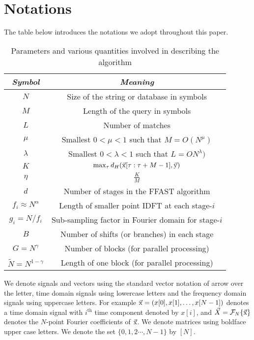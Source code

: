 \section{Notations}

The table below introduces the notations we adopt throughout this paper.
\begin{table}[h!]
\begin{center}
	\begin{tabular}{|c|c|} 	
		\hline		
		\textit{Symbol}	    &  \textit{Meaning} \\		
		\hline
		$N$           				& Size of the string or database in symbols \\
		\hline
		$M$   				        & Length of the query in symbols \\
\hline
        $L$    						&   Number of matches \\
\hline
		$\mu$ 				        & Smallest $0<\mu<1$ such that $M =O(N^{\mu})$\\		
\hline
		$\lambda$       		& Smallest $0<\lambda<1$ such that $L =ON^\lambda)$\\
        \hline
        $K$                        &$\max_{\tau}d_{H}(\vec{\mathrm{x}}[\tau:\tau+M-1],\vec{\mathrm{y}})$\\
        \hline
	    $\eta$             &$\frac{K}{M}$\\
	    \hline
$d$           				& Number of stages in the FFAST algorithm \\
		\hline
$f_i \approx N^\alpha$     & Length of smaller point IDFT at each stage-$i$\\
		\hline
$g_i = N/f_i$     	    &  Sub-sampling factor in Fourier domain for stage-$i$\\
		\hline
$B$   					    & Number of shifts (or branches) in each stage \\
\hline
$G = N^\gamma$    & Number of blocks (for parallel processing)\\
		\hline
$\tilde{N} = N^{1-\gamma}$   & Length of one block (for parallel processing)\\
		\hline
	\end{tabular}
\end{center}	
\caption{Parameters and various quantities involved in describing the algorithm}
\label{Table:Notations}
\end{table}	
We denote signals and vectors using the standard vector notation of arrow over the letter, time domain signals using lowercase letters and the frequency domain signals using uppercase letters. For example $\vec{\mathrm{x}} = (x[0], x[1], \ldots, x[N-1] )$ denotes a time domain signal with $i^{\text{th}}$ time component denoted by $x[i]$, and $\vec{X}= \mathcal{F}_{N}\{\vec{\mathrm{x}}\}$ denotes the $N$-point Fourier coefficients of $\vec{\mathrm{x}}$. We denote matrices using boldface upper case letters. We denote the set $\{0,1,2\cdots, N-1\}$ by $[N]$.%